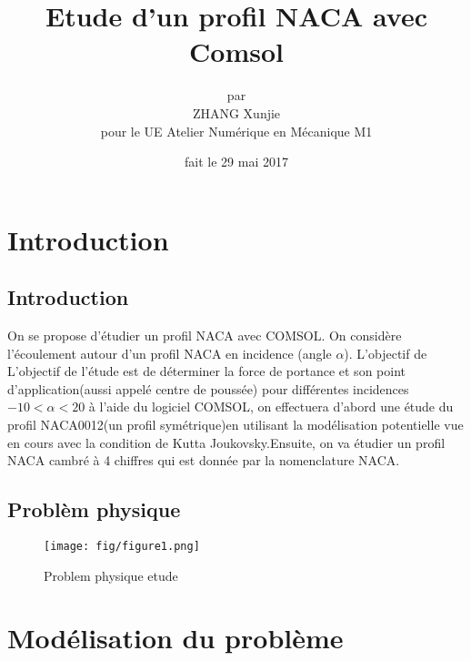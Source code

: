 \documentclass[a4paper,10pt]{report} %
\title{\textbf{Etude d'un profil NACA avec Comsol}} %
\author{par\\ZHANG Xunjie\\pour le UE Atelier Numérique en Mécanique M1 } %
\date{fait le 29 mai 2017} %
\begin{document}
\maketitle %
\tableofcontents %
\listoffigures %
\chapter{Introduction} 
\section{Introduction}
On se propose d’étudier un profil NACA avec COMSOL. On considère l’écoulement autour d’un profil NACA en incidence (angle $\alpha$). L'objectif de L’objectif de l’étude est de déterminer la force de portance et son point d’application(aussi appelé centre de poussée) pour différentes incidences$-10<{\alpha}<20$ à  l’aide du logiciel COMSOL, on effectuera d'abord une étude du profil NACA0012(un profil symétrique)en utilisant la modélisation potentielle vue en cours avec la condition de Kutta Joukovsky.Ensuite, on va étudier un profil NACA cambré à 4 chiffres qui est donnée par la nomenclature NACA.

\section{Problèm physique}

\begin{figure}[h]
\centering
\texttt{[image: fig/figure1.png]}
\caption{Problem physique etude}
\end{figure}

\chapter{Modélisation du problème } 
\end{document}
